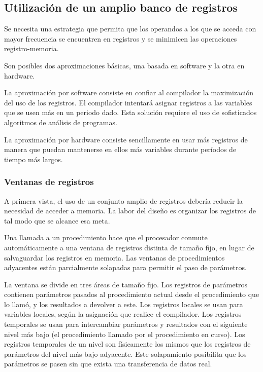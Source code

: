 \subsection{Utilización de un amplio banco de registros}

Se necesita una estrategia que permita que los operandos a los que se acceda con mayor frecuencia se encuentren en registros y se minimicen las operaciones registro-memoria.

Son posibles dos aproximaciones básicas, una basada en software y la otra en hardware.

La aproximación por software consiste en confiar al compilador la maximización del uso de los registros. El compilador intentará asignar registros a las variables que se usen más en un periodo dado. Esta solución requiere el uso de sofisticados algoritmos de análisis de programas.

La aproximación por hardware consiste sencillamente en usar más registros de manera que puedan mantenerse en ellos más variables durante períodos de tiempo más largos.

\subsubsection*{Ventanas de registros}

A primera vista, el uso de un conjunto amplio de registros debería reducir la necesidad de acceder a memoria. La labor del diseño es organizar los registros de tal modo que se alcance esa meta.

Una llamada a un procedimiento hace que el procesador conmute automáticamente a una ventana de registros distinta de tamaño fijo, en lugar de salvaguardar los registros en memoria. Las ventanas de procedimientos adyacentes están parcialmente solapadas para permitir el paso de parámetros.

La ventana se divide en tres áreas de tamaño fijo. Los registros de parámetros contienen parámetros pasados al procedimiento actual desde el procedimiento que lo llamó, y los resultados a devolver a este. Los registros locales se usan para variables locales, según la asignación que realice el compilador. Los registros temporales se usan para intercambiar parámetros y resultados con el siguiente nivel más bajo (el procedimiento llamado por el procedimiento en curso). Los registros temporales de un nivel son físicamente los mismos que los registros de parámetros del nivel más bajo adyacente. Este solapamiento posibilita que los parámetros se pasen sin que exista una transferencia de datos real.

